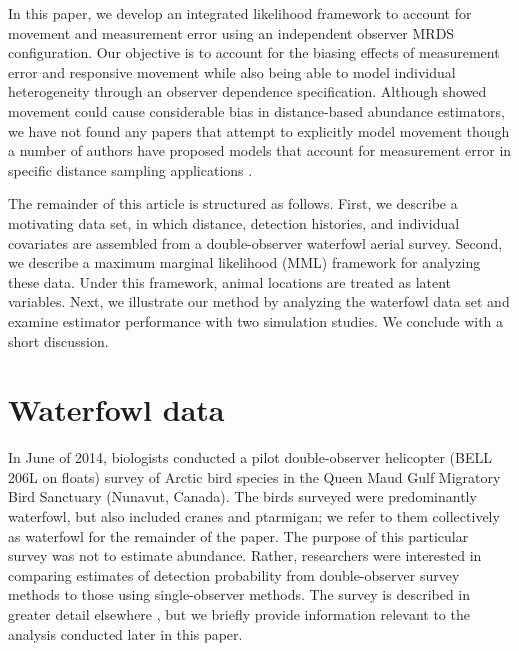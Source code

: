 \documentclass[12pt,fleqn]{article}
\begin{document}
In this paper, we develop an integrated likelihood framework to account for movement and measurement error using an independent observer MRDS configuration.  Our objective is to account for the biasing effects of measurement error and responsive movement while also being able to model individual heterogeneity through an observer dependence specification.  Although \citet{GlennieEtAl2015} showed movement could cause considerable bias in distance-based abundance estimators, we have not found any papers that attempt to explicitly model movement though a number of authors have proposed models that account for measurement error in specific distance sampling applications \citep[see e.g.][and references therein]{BorchersEtAl2010}.

The remainder of this article is structured as follows.  First, we describe a motivating data set, in which distance, detection histories, and individual covariates are assembled from a double-observer waterfowl aerial survey.  Second, we describe a maximum marginal likelihood (MML) framework for analyzing these data.  Under this framework, animal locations are treated as latent variables.  Next, we illustrate our method by analyzing the waterfowl data set and examine estimator performance with two simulation studies.  We conclude with a short discussion.


\section{Waterfowl data}

In June of 2014, biologists conducted a pilot double-observer helicopter (BELL 206L on floats) survey of Arctic bird species in the Queen Maud Gulf Migratory Bird Sanctuary (Nunavut, Canada). The birds surveyed were predominantly waterfowl, but also included cranes and ptarmigan; we refer to them collectively as waterfowl for the remainder of the paper. The purpose of this particular survey was not to estimate abundance. Rather, researchers were interested in comparing estimates of detection probability from double-observer survey methods to those using single-observer methods.
The survey is described in greater detail elsewhere \citep{AlisauskasConn2017}, but we briefly provide information relevant to the analysis conducted later in this paper.
\end{document}

